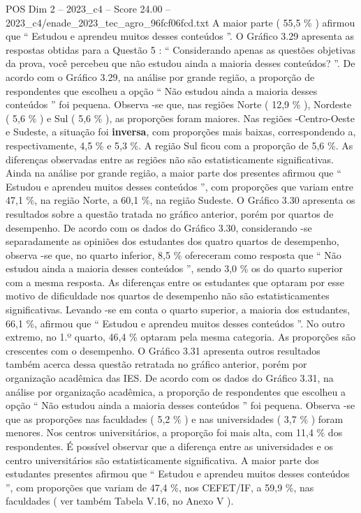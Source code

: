 \begin{textsample}{POS Dim 2 – 2023\_c4 – Score 24.00 – 2023\_c4/enade\_2023\_tec\_agro\_96fcf06fcd.txt}
A maior parte ( 55,5 \% ) afirmou que “ Estudou e aprendeu muitos desses conteúdos ”.
O Gráfico 3.29 apresenta as respostas obtidas para a Questão 5 : “ Considerando apenas as questões objetivas da prova, você percebeu que não estudou ainda a maioria desses conteúdos? ”.
De acordo com o Gráfico 3.29, na análise por grande região, a proporção de respondentes que escolheu a opção “ Não estudou ainda a maioria desses conteúdos ” foi pequena.
Observa -se que, nas regiões Norte ( 12,9 \% ), Nordeste ( 5,6 \% ) e Sul ( 5,6 \% ), as proporções foram maiores.
Nas regiões -Centro-Oeste e Sudeste, a situação foi \textbf{inversa}, com proporções mais baixas, correspondendo a, respectivamente, 4,5 \% e 5,3 \%.
A região Sul ficou com a proporção de 5,6 \%.
As diferenças observadas entre as regiões não são estatisticamente significativas.
Ainda na análise por grande região, a maior parte dos presentes afirmou que “ Estudou e aprendeu muitos desses conteúdos ”, com proporções que variam entre 47,1 \%, na região Norte, a 60,1 \%, na região Sudeste.
O Gráfico 3.30 apresenta os resultados sobre a questão tratada no gráfico anterior, porém por quartos de desempenho.
De acordo com os dados do Gráfico 3.30, considerando -se separadamente as opiniões dos estudantes dos quatro quartos de desempenho, observa -se que, no quarto inferior, 8,5 \% ofereceram como resposta que “ Não estudou ainda a maioria desses conteúdos ”, sendo 3,0 \% os do quarto superior com a mesma resposta.
As diferenças entre os estudantes que optaram por esse motivo de dificuldade nos quartos de desempenho não são estatisticamentes significativas.
Levando -se em conta o quarto superior, a maioria dos estudantes, 66,1 \%, afirmou que “ Estudou e aprendeu muitos desses conteúdos ”.
No outro extremo, no 1.º quarto, 46,4 \% optaram pela mesma categoria.
As proporções são crescentes com o desempenho.
O Gráfico 3.31 apresenta outros resultados também acerca dessa questão retratada no gráfico anterior, porém por organização acadêmica das IES.
De acordo com os dados do Gráfico 3.31, na análise por organização acadêmica, a proporção de respondentes que escolheu a opção “ Não estudou ainda a maioria desses conteúdos ” foi pequena.
Observa -se que as proporções nas faculdades ( 5,2 \% ) e nas universidades ( 3,7 \% ) foram menores.
Nos centros universitários, a proporção foi mais alta, com 11,4 \% dos respondentes.
É possível observar que a diferença entre as universidades e os centro universitários são estatisticamente significativa.
A maior parte dos estudantes presentes afirmou que “ Estudou e aprendeu muitos desses conteúdos ”, com proporções que variam de 47,4 \%, nos CEFET/IF, a 59,9 \%, nas faculdades ( ver também Tabela V.16, no Anexo V ).

\end{textsample}
